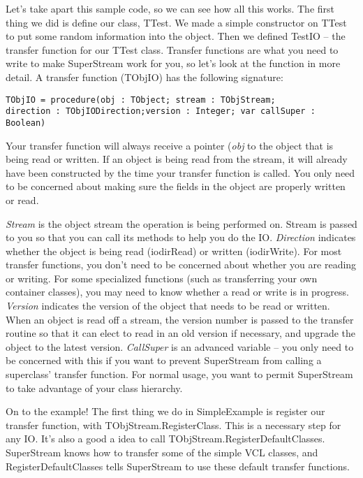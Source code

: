 \documentclass{report}
\begin{document}
Let's take apart this sample code, so we can see how all this works. The
first thing we did is define our class, TTest. We made a simple constructor
on TTest to put some random information into the object. Then we defined
TestIO -- the transfer function for our TTest class. Transfer functions are
what you need to write to make SuperStream work for you, so let's look at
the function in more detail. A transfer function (TObjIO) has the following
signature:

\begin{lstlisting}
TObjIO = procedure(obj : TObject; stream : TObjStream; 
direction : TObjIODirection;version : Integer; var callSuper : Boolean)
\end{lstlisting}

Your transfer function will always receive a pointer (\emph{obj} to the
object that is being read or written. If an object is being read from the
stream, it will already have been constructed by the time your transfer
function is called. You only need to be concerned about making sure the
fields in the object are properly written or read.

\emph{Stream} is the object stream the operation is being performed on.
Stream is passed to you so that you can call its methods to help you do the
IO.  \emph{Direction} indicates whether the object is being read (iodirRead)
or written (iodirWrite). For most transfer functions, you don't need to be
concerned about whether you are reading or writing.  For some specialized
functions (such as transferring your own container classes), you may need to
know whether a read or write is in progress. \emph{Version } indicates the
version of the object that needs to be read or written. When an object is
read off a stream, the version number is passed to the transfer routine so
that it can elect to read in an old version if necessary, and upgrade the
object to the latest version. \emph{CallSuper } is an advanced variable --
you only need to be concerned with this if you want to prevent SuperStream
from calling a superclass' transfer function. For normal usage, you want to
permit SuperStream to take advantage of your class hierarchy.

On to the example! The first thing we do in SimpleExample is register our
transfer function, with TObjStream.RegisterClass. This is a necessary step
for any IO. It's also a good a idea to call
TObjStream.RegisterDefaultClasses. SuperStream knows how to transfer some of
the simple VCL classes, and RegisterDefaultClasses tells SuperStream to use
these default transfer functions.
\end{document}

